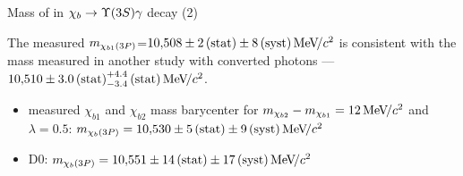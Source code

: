 \begin{frame}{Mass of \chiboneThreeP in $\chib \to \Y3S \gamma$ decay (2)}
\begin{center}
The measured $m_{\chi_{b 1}(3P)}$=\textcolor{red}{$10{,}508\pm2\mathrm{\,(stat)}\pm8\mathrm{\,(syst)}{\mathrm{\,Me\kern -0.1em V\!/}c^2}$} is consistent
with the mass measured in another study with converted photons ---
\textcolor{blue}{$10{,}510\pm3.0\mathrm{\,(stat)}^{+4.4}_{-3.4}\mathrm{\,(stat)}{\mathrm{\,Me\kern -0.1em V\!/}c^2}$}.
\end{center}
\begin{itemize}
\item \atlas measured $\chi_{b1}$ and $\chi_{b2}$  mass barycenter for $m_{\chi_{b2}} - m_{\chi_{b1}}=12{\mathrm{\,Me\kern -0.1em V\!/}c^2}$ and $\lambda=0.5$:
\textcolor{blue}{$m_{\chi_{b}(3P)} = 10{,}530\pm5\mathrm{\,(stat)}\pm9\mathrm{\,(syst)}{\mathrm{\,Me\kern -0.1em V\!/}c^2}$}
\item D0: \textcolor{blue}{$m_{\chi_{b}(3P)} = 10{,}551\pm14\mathrm{\,(stat)}\pm17\mathrm{\,(syst)}{\mathrm{\,Me\kern -0.1em V\!/}c^2}$}
\end{itemize}
\end{frame}

